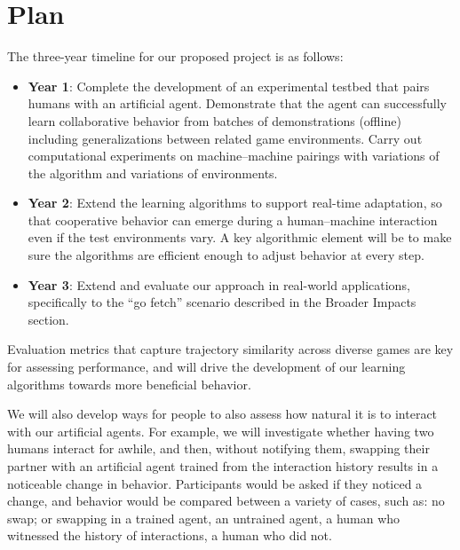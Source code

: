 
\section{Plan}

The three-year timeline for our proposed project is as follows:

\begin{itemize}
\item {\bf Year 1}: Complete the development of an experimental
  testbed that pairs humans with an artificial agent.  Demonstrate
  that the agent can successfully learn collaborative behavior from
  batches of demonstrations (offline) including generalizations
  between related game environments. Carry out computational
  experiments on machine--machine pairings with variations of the
  algorithm and variations of environments.

\item {\bf Year 2}: Extend the learning algorithms to support
  real-time adaptation, so that cooperative behavior can emerge during
  a human--machine interaction even if the test environments vary. A
  key algorithmic element will be to make sure the algorithms are
  efficient enough to adjust behavior at every step.

\item {\bf Year 3}: Extend and evaluate our approach in real-world
  applications, specifically to the ``go fetch'' scenario described in
  the Broader Impacts section. %

\end{itemize}


Evaluation metrics that capture trajectory similarity across diverse
games are key for assessing performance, and will drive the
development of our learning algorithms towards more beneficial
behavior.

We will also develop ways for people to also assess how natural it is
to interact with our artificial agents. For example, we will
investigate whether having two humans interact for awhile, and then,
without notifying them, swapping their partner with an artificial
agent trained from the interaction history results in a noticeable
change in behavior. Participants would be asked if they noticed a
change, and behavior would be compared between a variety of cases, 
such as: no swap; or swapping in a trained agent, an untrained agent, 
a human who witnessed the history of interactions, a human who did not.

